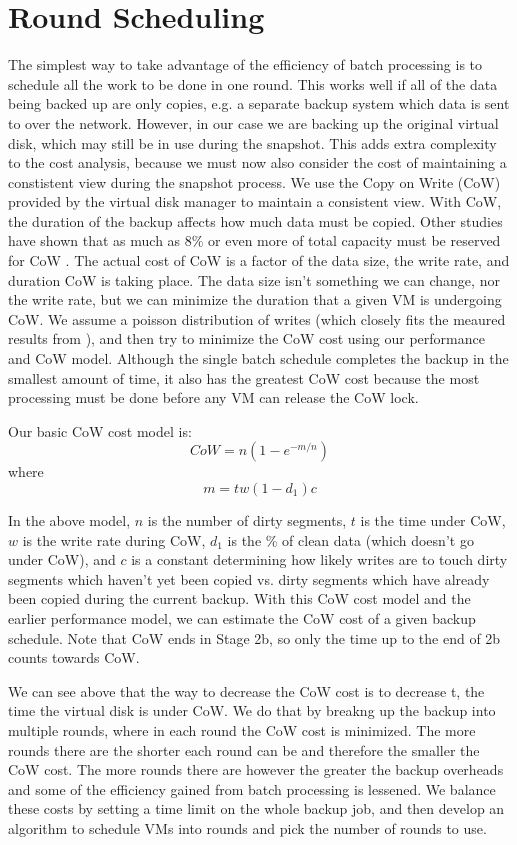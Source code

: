 \section{Round Scheduling}
\label{sect:scheduling}
The simplest way to take advantage of the efficiency of batch processing is to
schedule all the work to be done in one round.  This works well if all of the
data being backed up are only copies, e.g. a separate backup system which data
is sent to over the network. However, in our case we are backing up the
original virtual disk, which may still be in use during the snapshot. This adds
extra complexity to the cost analysis, because we must now also consider the
cost of maintaining a constistent view during the snapshot process. We use the
Copy on Write (CoW) provided by the virtual disk manager to maintain a
consistent view. With CoW, the
duration of the backup affects how much data must be copied. Other studies have
shown that as much as 8\% or even more of total capacity must be reserved for
CoW \cite{EMCIncrementalDataChanges}. The actual cost of CoW is a factor of the
data size, the write rate, and duration CoW is taking place. The data size
isn't something we can change, nor the write rate, but we can minimize the
duration that a given VM is undergoing CoW. We assume a poisson distribution of
writes (which closely fits the meaured results from
\cite{EMCIncrementalDataChanges}), and then try to minimize the CoW cost using
our performance and CoW model. Although the single batch schedule completes the
backup in the smallest amount of time, it also has the greatest CoW cost
because the most processing must be done before any VM can release the CoW
lock.

Our basic CoW cost model is:
\[
    CoW=n(1-e^{-m/n})
\]
    where
\[
    m=tw(1-d_1)c
\]

In the above model, $n$ is the number of dirty segments, $t$ is the time under
CoW, $w$ is the
write rate during CoW, $d_1$ is the \% of clean data (which doesn't go under
CoW), and $c$ is a constant determining how likely writes are to touch dirty
segments which haven't yet been copied vs. dirty segments which have already
been copied during the current backup. With this CoW cost model and the earlier
performance model, we can estimate the CoW cost of a given backup schedule.
Note that CoW ends in Stage 2b, so only the time up to the end of 2b counts
towards CoW. 

We can see above that the way to decrease the CoW cost is to decrease t, the
time the virtual disk is under CoW. We do that by breakng up the backup into
multiple
rounds, where in each round the CoW cost is minimized. The more rounds there
are the shorter each round can be and therefore the smaller the CoW cost. The
more rounds there are however the greater the backup overheads and some of the
efficiency gained from batch processing is lessened. We balance these costs by
setting a time limit on the whole backup job, and then develop an algorithm to
schedule VMs into rounds and pick the number of rounds to use.

